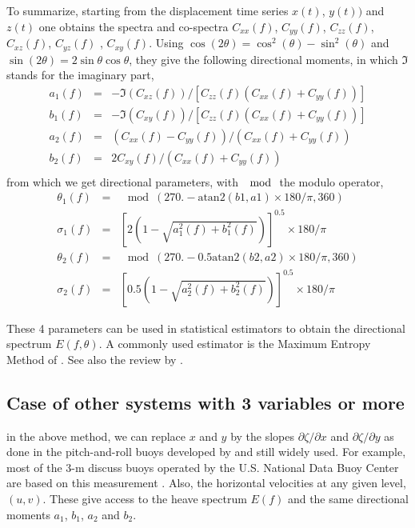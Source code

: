 To summarize, starting from the displacement time series  $x(t)$, $y(t))$ and $z(t)$ one obtains the 
spectra and co-spectra  $C_{xx}(f)$,  $C_{yy}(f)$,  $C_{zz}(f)$,  $C_{xz}(f)$, $C_{yz}(f)$ , $C_{xy}(f)$.
Using $\cos(2 \theta)=\cos^2(\theta) - \sin^2(\theta)$ and $\sin(2 \theta)=2 \sin \theta \cos\theta$, they give the following directional moments, in which $\Im $ stands for the imaginary part, 
\begin{eqnarray}
  a_1 ( f) &=&-\Im (C_{xz}(f))/\left[C_{zz}(f) \left(C_{xx}(f)+C_{yy}(f)\right)\right] \\
  b_1 ( f) &=&-\Im (C_{xy}(f))/\left[C_{zz}(f) \left(C_{xx}(f)+C_{yy}(f)\right)\right] \\
  a_2 ( f) &=&(C_{xx}(f)-C_{yy}(f))/(C_{xx}(f)+C_{yy}(f)) \\
  b_2 ( f) &=&2 C_{xy}(f) /(C_{xx}(f)+C_{yy}(f))  \\
\end{eqnarray}
from which we get directional parameters, with $\mod$ the modulo operator, 
\begin{eqnarray}
  \theta_{1}(f) &=&  \mod( 270.- \mathrm{atan2}(b1,a1)\times 180/\pi, 360)\\
  \sigma_{1}(f)&=&\left[2\left(1 - \sqrt{a_1^2(f) + b_1^2(f)} \right)\right]^{0.5}\times 180/\pi \\
  \theta_{2}(f) &=&  \mod( 270.- 0.5 \mathrm{atan2}(b2,a2)\times 180/\pi, 360)\\
  \sigma_{2}(f)&=&\left[0.5\left(1 - \sqrt{a_2^2(f) + b_2^2(f)} \right)\right]^{0.5}\times 180/\pi
\end{eqnarray}


These 4 parameters can be used in statistical estimators to obtain the directional spectrum $E(f,\theta)$. A commonly used estimator 
is the Maximum Entropy Method of \cite{Lygre&Krogstad1986}. See also the review by \cite{Benoit&al.1997}.

\subsection{Case of other systems with 3 variables or more}
in the above method, we can replace $x$ and $y$ by the slopes $\partial \zeta / \partial x$  and $\partial \zeta / \partial y$ as done in the pitch-and-roll buoys 
developed by \cite{Cartwright&Smith1964} and still widely used. For example, most of the 3-m discuss buoys operated by the U.S. National Data Buoy Center are based 
on this measurement \citep{Steele&al.1992}. Also, the horizontal 
velocities at any given level, $(u,v)$. These give access to the heave spectrum $E(f)$ and the same directional moments $a_1$, $b_1$, $a_2$ and $b_2$. 

